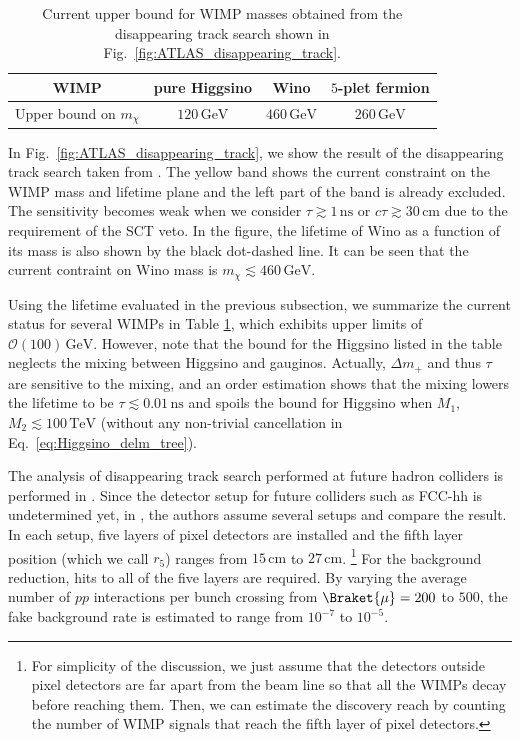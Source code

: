 \documentclass[12pt,twoside,book]{article}
\begin{document}
\begin{table}[t]
  \centering
  \begin{tabular}{c|ccc}
    WIMP & pure Higgsino & Wino & $5$-plet fermion \\ \hline
    Upper bound on $m_\chi$ & $120\, \mathrm{GeV}$ & $460\, \mathrm{GeV}$
    & $260\, \mathrm{GeV}$
  \end{tabular}
  \caption{
    Current upper bound for WIMP masses obtained from the disappearing track search shown in Fig.~\ref{fig:ATLAS_disappearing_track}.}
  \label{tab:disp_track_current}
\end{table}

In Fig.~\ref{fig:ATLAS_disappearing_track}, we show the result of the disappearing track search taken from \cite{Aaboud:2017mpt}.
The yellow band shows the current constraint on the WIMP mass and lifetime plane and the left part of the band is already excluded.
The sensitivity becomes weak when we consider $\tau \gtrsim 1\, \mathrm{ns}$ or $c \tau \gtrsim 30\, \mathrm{cm}$ due to the requirement of the SCT veto.
In the figure, the lifetime of Wino as a function of its mass is also shown by the black dot-dashed line.
It can be seen that the current contraint on Wino mass is $m_\chi \lesssim 460\,\mathrm{GeV}$.

Using the lifetime evaluated in the previous subsection, we summarize the current status for several WIMPs in Table \ref{tab:disp_track_current}, which exhibits upper limits of $\mathcal{O} (100)\,\mathrm{GeV}$.
However, note that the bound for the Higgsino listed in the table neglects the mixing between Higgsino and gauginos.
Actually, $\Delta m_{+}$ and thus $\tau$ are sensitive to the mixing, and an order estimation shows that the mixing lowers the lifetime to be $\tau \lesssim 0.01\,\mathrm{ns}$ and spoils the bound for Higgsino when $M_1$, $M_2 \lesssim 100\,\mathrm{TeV}$ (without any non-trivial cancellation in Eq.~\eqref{eq:Higgsino_delm_tree}).

The analysis of disappearing track search performed at future hadron colliders is performed in \cite{Han:2018wus, Saito:2019rtg}.
Since the detector setup for future colliders such as FCC-hh is undetermined yet, in \cite{Saito:2019rtg}, the authors assume several setups and compare the result.
In each setup, five layers of pixel detectors are installed and the fifth layer position (which we call $r_5$) ranges from $15\, \mathrm{cm}$ to $27\, \mathrm{cm}$.
\footnote{
  For simplicity of the discussion, we just assume that the detectors outside pixel detectors are far apart from the beam line so that all the WIMPs decay before reaching them.
  Then, we can estimate the discovery reach by counting the number of WIMP signals that reach the fifth layer of pixel detectors.
}
For the background reduction, hits to all of the five layers are required.
By varying the average number of $pp$ interactions per bunch crossing from $\Braket{\mu} = 200$ to $500$, the fake background rate is estimated to range from $10^{-7}$ to $10^{-5}$.
\end{document}
